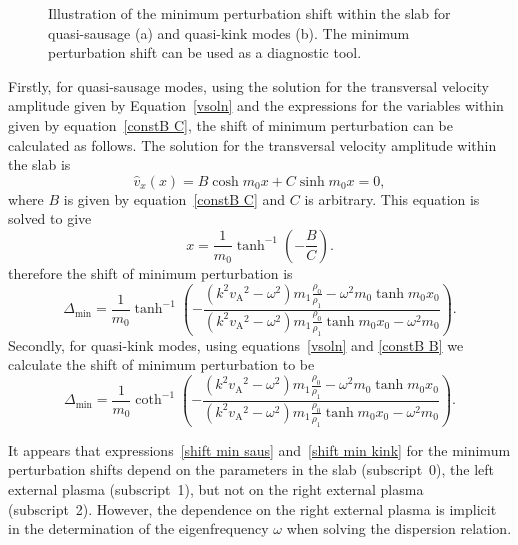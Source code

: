 \documentclass[namedreferences]{solarphysics}
\numberwithin{equation}{section}
\begin{document}
\begin{article}
\begin{figure}
{{{
}}}

\caption{Illustration of the minimum perturbation shift within the slab for quasi-sausage (a) and quasi-kink modes (b). The minimum perturbation shift can be used as a diagnostic tool.}
\end{figure}

Firstly, for quasi-sausage modes, using the solution for the transversal velocity amplitude given by Equation~\eqref{vsoln} and the expressions for the variables within given by equation~\eqref{constB C}, the shift of minimum perturbation can be calculated as follows. The solution for the transversal velocity amplitude within the slab is
\begin{equation}
\widehat{v}_x(x) = B\cosh{m_0x}+C\sinh{m_0x} = 0,
\end{equation}
where $B$ is given by equation~\eqref{constB C} and $C$ is arbitrary. This equation is solved to give
\begin{equation}
x = \frac{1}{m_0} \tanh^{-1}\left(-\frac{B}{C}\right). \label{disp of min power saus}
\end{equation}
therefore the shift of minimum perturbation is
\begin{equation}
\Delta_\textrm{min} = \frac{1}{m_0}\tanh^{-1}\left(-\frac{(k^2{v_\textrm{A}}^2-\omega^2)m_1\frac{\rho_0}{\rho_1} - \omega^2{m_0}\tanh{m_0x_0}}{(k^2{v_\textrm{A}}^2-\omega^2)m_1\frac{\rho_0}{\rho_1}\tanh{m_0x_0} - \omega^2{m_0}}\right). \label{shift min saus}
\end{equation}
Secondly, for quasi-kink modes, using equations~\eqref{vsoln} and \eqref{constB B} we calculate the shift of minimum perturbation to be
\begin{equation}
\Delta_\textrm{min} = \frac{1}{m_0}\coth^{-1}\left(-\frac{(k^2{v_\textrm{A}}^2-\omega^2)m_1\frac{\rho_0}{\rho_1} - \omega^2{m_0}\tanh{m_0x_0}}{(k^2{v_\textrm{A}}^2-\omega^2)m_1\frac{\rho_0}{\rho_1}\tanh{m_0x_0} - \omega^2{m_0}}\right). \label{shift min kink}
\end{equation}

It appears that expressions~\eqref{shift min saus} and~\eqref{shift min kink} for the minimum perturbation shifts depend on the parameters in the slab (subscript~0), the left external plasma (subscript~1), but not on the right external plasma (subscript~2). However, the dependence on the right external plasma is implicit in the determination of the eigenfrequency $\omega$ when solving the dispersion relation.


\end{article}
\end{document}
